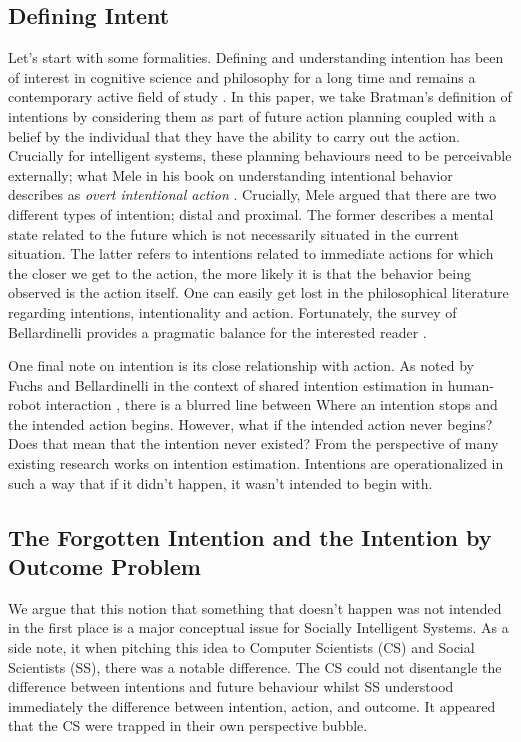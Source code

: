 \documentclass[manuscript,screen,review]{acmart}
\begin{document}
\subsection{Defining Intent}
Let's start with some formalities. Defining and understanding intention has been of interest in cognitive science and philosophy for a long time and remains a contemporary active field of study \cite{bratman1987intention,mele1992springs,plaks2015construal,doi:10.1080/09515089.2021.1915471}. In this paper, we take Bratman's \cite{bratman1987intention} definition of intentions by considering them as part of future action planning coupled with a belief by the individual that they have the ability to carry out the action. Crucially for intelligent systems, these planning behaviours need to be perceivable externally; what Mele in his book on understanding intentional behavior describes as \emph{overt intentional action} \cite{mele1992springs}. Crucially, Mele argued that there are two different types of intention; distal and proximal. The former describes a mental state related to the future which is not necessarily situated in the current situation. The latter refers to intentions related to immediate actions for which the closer we get to the action, the more likely it is that the behavior being observed is the action itself. One can easily get lost in the philosophical literature regarding intentions, intentionality and action. Fortunately, the survey of Bellardinelli provides a pragmatic balance for the interested reader \cite{belardinelli2023gazebased}. 

One final note on intention is its close relationship with action. As noted by Fuchs and Bellardinelli in the context of shared intention estimation in human-robot interaction \cite{10.3389/fnbot.2021.647930}, there is a blurred line between Where an intention stops and the intended action begins. However, what if the intended action never begins? Does that mean that the intention never existed? From the perspective of many existing research works on intention estimation. Intentions are operationalized in such a way that if it didn't happen, it wasn't intended to begin with. 

\subsection{The Forgotten Intention and the Intention by Outcome Problem}
We argue that this notion that something that doesn't happen was not intended in the first place is a major conceptual issue for Socially Intelligent Systems. As a side note, it when pitching this idea to Computer Scientists (CS) and Social Scientists (SS), there was a notable difference. The CS could not disentangle the difference between intentions and future behaviour whilst SS understood immediately the difference between intention, action, and outcome. It appeared that the CS were trapped in their own perspective bubble. 
\end{document}
